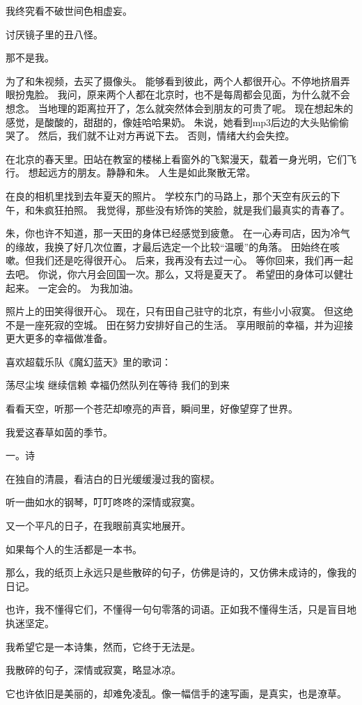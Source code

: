 \documentclass[12pt,a4paper]{article}
\newcommand{\subpart}[1]{
	\begingroup \par
	\vspace{1ex} \centering #1
	\par \endgroup \nopagebreak[4]
}
\begin{document}
		我终究看不破世间色相虚妄。\par
		讨厌镜子里的丑八怪。\par
		那不是我。

	\endwriting



		为了和朱视频，去买了摄像头。
		能够看到彼此，两个人都很开心。不停地挤眉弄眼扮鬼脸。
		我问，原来两个人都在北京时，也不是每周都会见面，为什么就不会想念。
		当地理的距离拉开了，怎么就突然体会到朋友的可贵了呢。
		现在想起朱的感觉，是酸酸的，甜甜的，像娃哈哈果奶。
		朱说，她看到mp3后边的大头贴偷偷哭了。
		然后，我们就不让对方再说下去。
		否则，情绪大约会失控。

		在北京的春天里。田站在教室的楼梯上看窗外的飞絮漫天，载着一身光明，它们飞行。
		想起远方的朋友。静静和朱。
		人生是如此聚散无常。

		在良的相机里找到去年夏天的照片。
		学校东门的马路上，那个天空有灰云的下午，和朱疯狂拍照。
		我觉得，那些没有矫饰的笑脸，就是我们最真实的青春了。


		朱，你也许不知道，那一天田的身体已经感觉到疲惫。
		在一心寿司店，因为冷气的缘故，我换了好几次位置，才最后选定一个比较“温暖”的角落。
		田始终在咳嗽。但我们还是吃得很开心。
		后来，我再没有去过一心。
		等你回来，我们再一起去吧。
		你说，你六月会回国一次。那么，又将是夏天了。
		希望田的身体可以健壮起来。
		一定会的。
		为我加油。


		照片上的田笑得很开心。
		现在，只有田自己驻守的北京，有些小小寂寞。
		但这绝不是一座死寂的空城。
		田在努力安排好自己的生活。
		享用眼前的幸福，并为迎接更大更多的幸福做准备。

		喜欢超载乐队《魔幻蓝天》里的歌词：

		荡尽尘埃
		继续信赖
		幸福仍然队列在等待
		我们的到来

		看看天空，听那一个苍茫却嘹亮的声音，瞬间里，好像望穿了世界。

	\endwriting



		我爱这春草如茵的季节。

		\subpart{一。诗}

		在独自的清晨，看洁白的日光缓缓漫过我的窗棂。\par
		听一曲如水的钢琴，叮叮咚咚的深情或寂寞。\par
		又一个平凡的日子，在我眼前真实地展开。

		如果每个人的生活都是一本书。\par
		那么，我的纸页上永远只是些散碎的句子，仿佛是诗的，又仿佛未成诗的，像我的日记。\par
		也许，我不懂得它们，不懂得一句句零落的词语。正如我不懂得生活，只是盲目地执迷坚定。\par
		我希望它是一本诗集，然而，它终于无法是。\par
		我散碎的句子，深情或寂寞，略显冰凉。\par
		它也许依旧是美丽的，却难免凌乱。像一幅信手的速写画，是真实，也是潦草。
\end{document}
